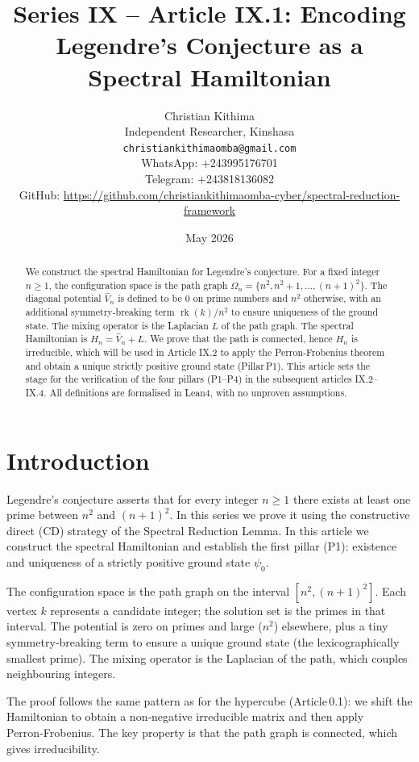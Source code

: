 \documentclass[11pt,a4paper]{article}
\title{Series IX – Article IX.1: Encoding Legendre's Conjecture as a Spectral Hamiltonian}
\author{Christian Kithima \\
Independent Researcher, Kinshasa \\
\texttt{christiankithimaomba@gmail.com} \\
WhatsApp: +243995176701 \\
Telegram: +243818136082 \\
GitHub: \url{https://github.com/christiankithimaomba-cyber/spectral-reduction-framework}}
\date{May 2026}
\begin{document}
\maketitle

\begin{abstract}
We construct the spectral Hamiltonian for Legendre's conjecture. For a fixed integer $n\ge 1$, the configuration space is the path graph $\Omega_n = \{n^2, n^2+1, \dots, (n+1)^2\}$. The diagonal potential $\hat{V}_n$ is defined to be $0$ on prime numbers and $n^2$ otherwise, with an additional symmetry‑breaking term $\operatorname{rk}(k)/n^2$ to ensure uniqueness of the ground state. The mixing operator is the Laplacian $L$ of the path graph. The spectral Hamiltonian is $H_n = \hat{V}_n + L$. We prove that the path is connected, hence $H_n$ is irreducible, which will be used in Article IX.2 to apply the Perron‑Frobenius theorem and obtain a unique strictly positive ground state (Pillar P1). This article sets the stage for the verification of the four pillars (P1–P4) in the subsequent articles IX.2–IX.4. All definitions are formalised in Lean4, with no unproven assumptions.
\end{abstract}

\tableofcontents

\section{Introduction}

Legendre's conjecture asserts that for every integer $n\ge 1$ there exists at least one prime between $n^2$ and $(n+1)^2$. In this series we prove it using the constructive direct (CD) strategy of the Spectral Reduction Lemma. In this article we construct the spectral Hamiltonian and establish the first pillar (P1): existence and uniqueness of a strictly positive ground state $\psi_0$.

The configuration space is the path graph on the interval $[n^2, (n+1)^2]$. Each vertex $k$ represents a candidate integer; the solution set is the primes in that interval. The potential is zero on primes and large ($n^2$) elsewhere, plus a tiny symmetry‑breaking term to ensure a unique ground state (the lexicographically smallest prime). The mixing operator is the Laplacian of the path, which couples neighbouring integers.

The proof follows the same pattern as for the hypercube (Article 0.1): we shift the Hamiltonian to obtain a non‑negative irreducible matrix and then apply Perron‑Frobenius. The key property is that the path graph is connected, which gives irreducibility.
\end{document}
